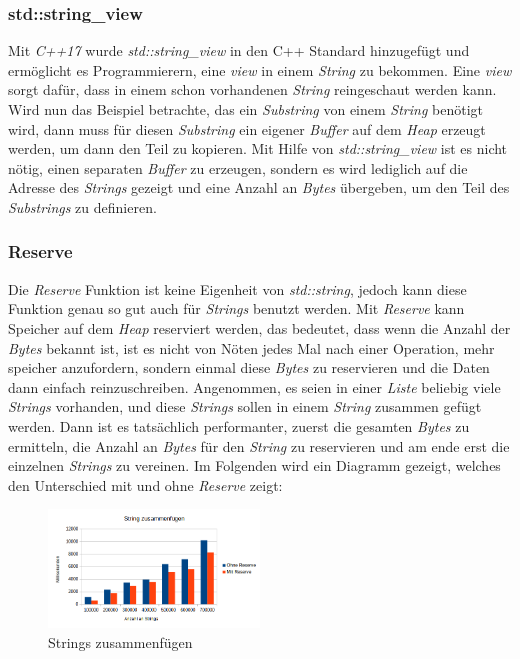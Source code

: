 \subsubsection{std::string\_view}
Mit \emph{C++17} wurde \emph{std::string\_view} in den C++ Standard hinzugefügt und ermöglicht es
Programmierern, eine \emph{view} in einem \emph{String} zu bekommen. Eine \emph{view} sorgt
dafür, dass in einem schon vorhandenen \emph{String} reingeschaut werden kann. Wird nun das Beispiel
betrachte, das ein \emph{Substring} von einem \emph{String} benötigt wird, dann muss für diesen
\emph{Substring} ein eigener \emph{Buffer} auf dem \emph{Heap} erzeugt werden, um dann den Teil
zu kopieren. Mit Hilfe von \emph{std::string\_view} ist es nicht nötig, einen separaten
\emph{Buffer} zu erzeugen, sondern es wird lediglich auf die Adresse des \emph{Strings} gezeigt
und eine Anzahl an \emph{Bytes} übergeben, um den Teil des \emph{Substrings} zu definieren.
\newline
\subsubsection{Reserve}
Die \emph{Reserve} Funktion ist keine Eigenheit von \emph{std::string}, jedoch kann diese
Funktion genau so gut auch für \emph{Strings} benutzt werden. Mit \emph{Reserve} kann Speicher
auf dem \emph{Heap} reserviert werden, das bedeutet, dass wenn die Anzahl der \emph{Bytes} bekannt ist,
ist es nicht von Nöten jedes Mal nach einer Operation, mehr speicher anzufordern, sondern einmal
diese \emph{Bytes} zu reservieren und die Daten dann einfach reinzuschreiben. Angenommen, es
seien in einer \emph{Liste} beliebig viele \emph{Strings} vorhanden, und diese \emph{Strings}
sollen in  einem \emph{String} zusammen gefügt werden. Dann ist es tatsächlich performanter,
zuerst die gesamten \emph{Bytes} zu ermitteln, die Anzahl an \emph{Bytes} für den \emph{String} zu
reservieren und am ende erst die einzelnen \emph{Strings} zu vereinen. Im Folgenden wird ein
Diagramm gezeigt, welches den Unterschied mit und ohne \emph{Reserve} zeigt:
\begin{figure}[h]
	\centering
	\includegraphics[width=0.5\textwidth]{bilder/StringReserve}
	\caption[StringsZusammenfügen]{Strings zusammenfügen}
	\label{img:StringsZusammenfügen}
\end{figure}